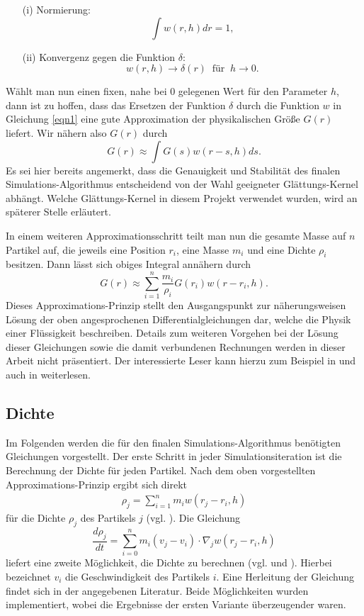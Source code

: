 \begin{enumerate}
\item[(i)] Normierung:
\[
\int w(r,h) dr = 1,
\]
\item[(ii)] Konvergenz gegen die Funktion $\delta$:
\[
w(r,h) \to \delta(r) \ \text{ für } \ h \to 0.
\]
\end{enumerate}
Wählt man nun einen fixen, nahe bei $0$ gelegenen Wert für den Parameter $h$, dann ist zu hoffen, dass das Ersetzen der Funktion $\delta$ durch die Funktion $w$ in Gleichung \ref{eqn1} eine gute Approximation der physikalischen Größe $G(r)$ liefert. Wir nähern also $G(r)$ durch
\[
G(r) \approx \int G(s)w(r - s, h) ds.
\]
Es sei hier bereits angemerkt, dass die Genauigkeit und Stabilität des finalen Simula\-tions-Algorithmus entscheidend von der Wahl geeigneter Glättungs-Kernel abhängt. Welche Glättungs-Kernel in diesem Projekt verwendet wurden, wird an späterer Stelle erläutert.
\medskip

\noindent In einem weiteren Approximationsschritt teilt man nun die gesamte Masse auf $n$ Partikel auf, die jeweils eine Position $r_i$, eine Masse $m_i$ und eine Dichte $\rho_i$ besitzen. Dann lässt sich obiges Integral annähern durch
\[
G(r) \approx \sum_{i=1}^n\frac{m_i}{\rho_i} G(r_i)w(r - r_i, h).
\]
Dieses Approximations-Prinzip stellt den Ausgangspunkt zur näherungsweisen Lö\-sung der oben angesprochenen Differentialgleichungen dar, welche die Physik einer Flüssigkeit beschreiben. Details zum weiteren Vorgehen bei der Lösung dieser Gleichungen sowie die damit verbundenen Rechnungen werden in dieser Arbeit nicht präsentiert. Der interessierte Leser kann hierzu zum Beispiel in \cite{IntroSPH} und auch in \cite{FlowSPH} weiterlesen.


\subsection*{Dichte}
Im Folgenden werden die für den finalen Simulations-Algorithmus benö\-tigten Gleichungen vorgestellt. Der erste Schritt in jeder Simulationsiteration ist die Berechnung der Dichte für jeden Partikel. Nach dem oben vorgestellten Approxima\-tions-Prinzip ergibt sich direkt
\begin{align}\label{density}
\rho_j = \sum_{i=1}^n m_i w(r_j - r_i, h)
\end{align}
für die Dichte $\rho_j$ des Partikels $j$ (vgl. \cite[S. 90]{IntroSPH}). Die Gleichung
\[
\frac{d\rho_j}{dt} = \sum_{i = 0}^n m_i (v_j-v_i) \cdot \nabla_j w(r_j - r_i, h)
\]
liefert eine zweite Möglichkeit, die Dichte zu berechnen (vgl. \cite[S. 91]{IntroSPH} und \cite[S. 400]{FlowSPH}). Hierbei bezeichnet $v_i$ die Geschwindigkeit des Partikels $i$. Eine Herleitung der Gleichung findet sich in der angegebenen Literatur. Beide Möglichkeiten wurden implementiert, wobei die Ergebnisse der ersten Variante überzeugender waren.

